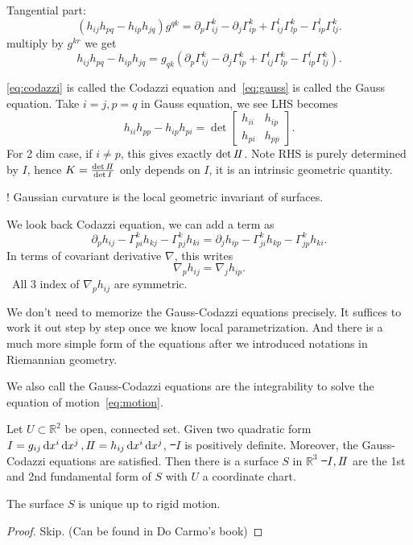 Tangential part: \[
    (h_{ij}h_{pq}-h_{ip}h_{jq})g^{qk}
    =\partial_p \Gamma_{ij}^k-\partial_j\Gamma_{ip}^k
    +\Gamma_{ij}^l\Gamma_{lp}^k-\Gamma_{ip}^l\Gamma_{lj}^k
.\] multiply by \(g^{kr}\) we get
\begin{equation}\label{eq:gauss}
    h_{ij}h_{pq}-h_{ip}h_{jq}=
    g_{qk}\left(\partial_p \Gamma_{ij}^k-\partial_j\Gamma_{ip}^k
    +\Gamma_{ij}^l\Gamma_{lp}^k-\Gamma_{ip}^l\Gamma_{lj}^k\right)
.\end{equation}

\cref{eq:codazzi} is called the Codazzi equation and~\cref{eq:gauss} is called
the Gauss equation. Take \(i=j,p=q\) in Gauss equation, we see LHS becomes \[
    h_{ii}h_{pp}-h_{ip}h_{pi}=\det\begin{bmatrix}
        h_{ii} & h_{ip} \\
        h_{pi} & h_{pp}
    \end{bmatrix}
.\] For 2 dim case, if \(i\neq p\), this gives exactly \(\det I\!I\). Note RHS
is purely determined by \(I\), hence \(K=\frac{\det I\!I}{\det I}\) only depends
on \(I\), it is an intrinsic geometric quantity.

{\color{red}\large !} Gaussian curvature is the local geometric invariant of
surfaces.

We look back Codazzi equation, we can add a term as \[
    \partial_{p}h_{ij}-\Gamma_{pi}^kh_{kj}-\boxed{\Gamma_{pj}^kh_{ki}}
    =\partial_{j}h_{ip}-\Gamma_{ji}^kh_{kp}-\boxed{\Gamma_{jp}^kh_{ki}}
.\] In terms of covariant derivative \(\nabla\), this writes \[
    \nabla_p h_{ij}=\nabla_{j} h_{ip}
.\] \ie\ All 3 index of \(\nabla_p h_{ij}\) are symmetric.

\begin{remark}
    We don't need to memorize the Gauss-Codazzi equations precisely. It
    suffices to work it out step by step once we know local parametrization.
    And there is a much more simple form of the equations after we introduced
    notations in Riemannian geometry.
\end{remark}

We also call the Gauss-Codazzi equations are the integrability to solve
the equation of motion~\cref{eq:motion}.

\begin{theorem}
    Let \(U\subset \mathbb{R}^2\) be open, connected set. Given two quadratic
    form \(I=g_{ij}\dd{x^i}\dd{x^j}, I\!I=h_{ij}\dd{x^i}\dd{x^j}\), \st\ \(I\) is
    positively definite. Moreover, the Gauss-Codazzi equations are satisfied.
    Then there is a surface \(S\) in \(\mathbb{R}^3\) \st\ \(I,I\!I\) are the 1st
    and 2nd fundamental form of \(S\) with \(U\) a coordinate chart.

    The surface \(S\) is unique up to rigid motion.
\end{theorem}
\begin{proof}
    Skip. (Can be found in Do Carmo's book)
\end{proof}

\newpage
